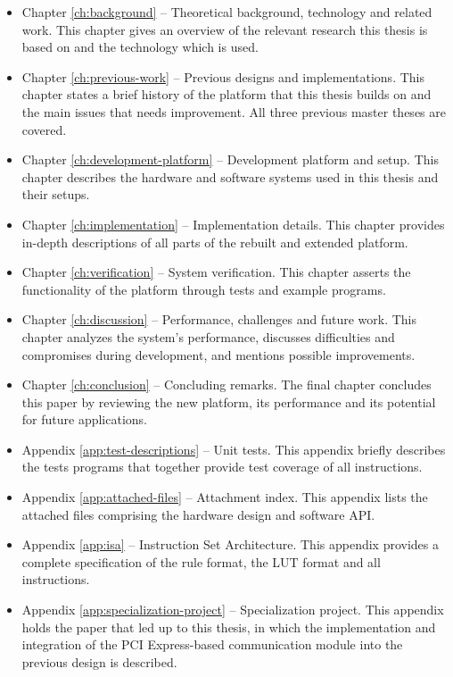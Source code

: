 \begin{itemize}
    \item Chapter \ref{ch:background} –
        Theoretical background, technology and related work.
        This chapter gives an overview of the relevant research this thesis is based on and the technology which is used.
    \item Chapter \ref{ch:previous-work} –
        Previous designs and implementations.
        This chapter states a brief history of the platform that this thesis builds on and the main issues that needs improvement.
        All three previous master theses are covered.
    \item Chapter \ref{ch:development-platform} –
        Development platform and setup.
        This chapter describes the hardware and software systems used in this thesis and their setups.
    \item Chapter \ref{ch:implementation} –
        Implementation details.
        This chapter provides in-depth descriptions of all parts of the rebuilt and extended platform.
    \item Chapter \ref{ch:verification} –
        System verification.
        This chapter asserts the functionality of the platform through tests and example programs.
    \item Chapter \ref{ch:discussion} –
        Performance, challenges and future work.
        This chapter analyzes the system's performance, discusses difficulties and compromises during development, and mentions possible improvements.
    \item Chapter \ref{ch:conclusion} –
        Concluding remarks.
        The final chapter concludes this paper by reviewing the new platform, its performance and its potential for future applications.
    \item Appendix \ref{app:test-descriptions} –
        Unit tests.
        This appendix briefly describes the tests programs that together provide test coverage of all instructions.
    \item Appendix \ref{app:attached-files} –
        Attachment index.
        This appendix lists the attached files comprising the hardware design and software API.
    \item Appendix \ref{app:isa} –
        Instruction Set Architecture.
        This appendix provides a complete specification of the rule format, the LUT format and all instructions.
    \item Appendix \ref{app:specialization-project} –
        Specialization project.
        This appendix holds the paper that led up to this thesis, in which the implementation and integration of the PCI Express-based communication module into the previous design is described.
\end{itemize}
